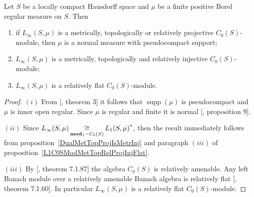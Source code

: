 \begin{proposition}\label{LinftyC0SModMetTopRelProjIngFlat} Let $S$ be a locally
compact Hausdorff space and $\mu$ be a finite positive Borel regular measure on
$S$. Then

\begin{enumerate}[label = (\roman*)]
    \item if $L_\infty(S,\mu)$ is a metrically, topologically or relatively 
    projective $C_0(S)$-module, then $\mu$ is a normal measure 
    with pseudocompact support; 

    \item $L_\infty(S,\mu)$ is a metrically, topologically and relatively 
    injective $C_0(S)$-module;

    \item $L_\infty(S,\mu)$ is a relatively flat $C_0(S)$-module.
\end{enumerate}
\end{proposition}
\begin{proof} $(i)$ From [\cite{NemRelProjModLp}, theorem 3] it follows 
that $\operatorname{supp}(\mu)$ is pseudocompact and $\mu$ is inner open 
regular. Since $\mu$ is regular and finite it is 
normal [\cite{NemRelProjModLp}, proposition 9].
    
$(ii)$ Since
$L_\infty(S,\mu)\mathop{\mathbin{\cong}}\limits_{\mathbf{mod}_1-C_0(S)}{L_1(S,\mu)}^*$, then the result
immediately follows from proposition~\ref{DualMetTopProjIsMetrInj} and paragraph
$(iii)$ of proposition~\ref{L1C0SModMetTopRelProjInjFlat}.

$(iii)$ By [\cite{HelBanLocConvAlg}, theorem 7.1.87] the algebra $C_0(S)$ is
relatively amenable. Any left Banach module over a relatively amenable Banach
algebra is relatively flat [\cite{HelBanLocConvAlg}, theorem 7.1.60]. In
particular $L_\infty(S,\mu)$ is a relatively flat $C_0(S)$-module.
\end{proof}

